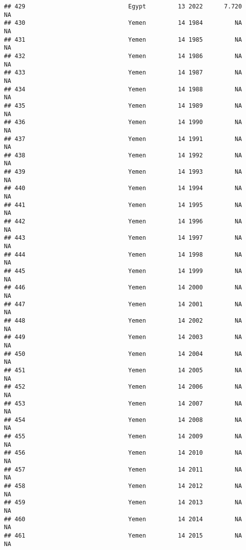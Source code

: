 \documentclass[
]{article}
\begin{document}
\begin{verbatim}
## 429                             Egypt         13 2022      7.720         NA
## 430                             Yemen         14 1984         NA         NA
## 431                             Yemen         14 1985         NA         NA
## 432                             Yemen         14 1986         NA         NA
## 433                             Yemen         14 1987         NA         NA
## 434                             Yemen         14 1988         NA         NA
## 435                             Yemen         14 1989         NA         NA
## 436                             Yemen         14 1990         NA         NA
## 437                             Yemen         14 1991         NA         NA
## 438                             Yemen         14 1992         NA         NA
## 439                             Yemen         14 1993         NA         NA
## 440                             Yemen         14 1994         NA         NA
## 441                             Yemen         14 1995         NA         NA
## 442                             Yemen         14 1996         NA         NA
## 443                             Yemen         14 1997         NA         NA
## 444                             Yemen         14 1998         NA         NA
## 445                             Yemen         14 1999         NA         NA
## 446                             Yemen         14 2000         NA         NA
## 447                             Yemen         14 2001         NA         NA
## 448                             Yemen         14 2002         NA         NA
## 449                             Yemen         14 2003         NA         NA
## 450                             Yemen         14 2004         NA         NA
## 451                             Yemen         14 2005         NA         NA
## 452                             Yemen         14 2006         NA         NA
## 453                             Yemen         14 2007         NA         NA
## 454                             Yemen         14 2008         NA         NA
## 455                             Yemen         14 2009         NA         NA
## 456                             Yemen         14 2010         NA         NA
## 457                             Yemen         14 2011         NA         NA
## 458                             Yemen         14 2012         NA         NA
## 459                             Yemen         14 2013         NA         NA
## 460                             Yemen         14 2014         NA         NA
## 461                             Yemen         14 2015         NA         NA

\end{verbatim}
\end{document}
